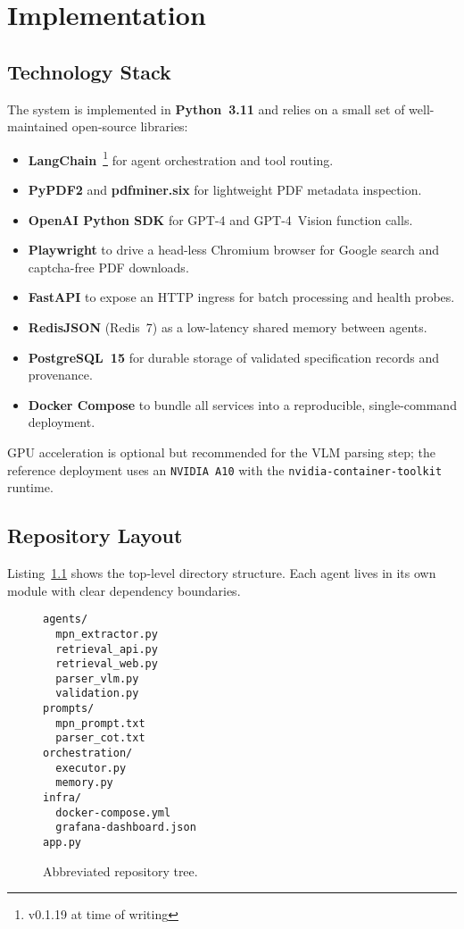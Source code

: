 \chapter{Implementation}
\label{chapter:implementation}

\section{Technology Stack}
The system is implemented in \textbf{Python~3.11} and relies on a small set of well-maintained open-source libraries:
\begin{itemize}
  \item \textbf{LangChain}~\footnote{v0.1.19 at time of writing} for agent orchestration and tool routing.
  \item \textbf{PyPDF2} and \textbf{pdfminer.six} for lightweight PDF metadata inspection.
  \item \textbf{OpenAI Python SDK} for GPT-4 and GPT-4~Vision function calls.
  \item \textbf{Playwright} to drive a head-less Chromium browser for Google search and captcha-free PDF downloads.
  \item \textbf{FastAPI} to expose an HTTP ingress for batch processing and health probes.
  \item \textbf{RedisJSON} (Redis~7) as a low-latency shared memory between agents.
  \item \textbf{PostgreSQL~15} for durable storage of validated specification records and provenance.
  \item \textbf{Docker Compose} to bundle all services into a reproducible, single-command deployment.
\end{itemize}
GPU acceleration is optional but recommended for the VLM parsing step; the reference deployment uses an \texttt{NVIDIA~A10} with the \texttt{nvidia-container-toolkit} runtime.

\section{Repository Layout}
Listing~\ref{lst:tree} shows the top-level directory structure.  Each agent lives in its own module with clear dependency boundaries.
\begin{figure}[H]
\centering
\begin{minipage}{0.9\textwidth}
\begin{verbatim}
agents/
  mpn_extractor.py
  retrieval_api.py
  retrieval_web.py
  parser_vlm.py
  validation.py
prompts/
  mpn_prompt.txt
  parser_cot.txt
orchestration/
  executor.py
  memory.py
infra/
  docker-compose.yml
  grafana-dashboard.json
app.py
\end{verbatim}
\end{minipage}
\caption{Abbreviated repository tree.}
\label{lst:tree}
\end{figure}

